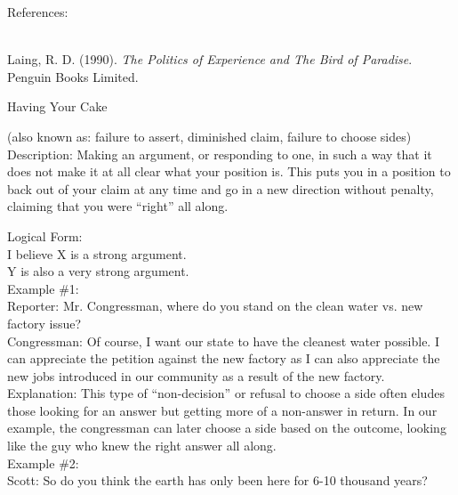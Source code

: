 \documentclass[a4paper,12pt,single,pdftex]{scrartcl}
\begin{document}
    References:

    
      
        
      \\

      
        
          Laing, R. D. (1990). {\it The Politics of Experience and The Bird of Paradise}. Penguin Books Limited.
        
      
    
  

Having Your Cake
    
      (also known as: failure to assert, diminished claim, failure to choose sides)
    \\

  
    Description: Making an argument, or responding to one, in such a way that it does not make it at all clear what your position is.  This puts you in a position to back out of your claim at any time and go in a new direction without penalty, claiming that you were “right” all along. 

    
      Logical Form:
    \\

    
      I believe X is a strong argument.
    \\

    
      Y is also a very strong argument.
    \\

    
      Example \#1:
    \\

    
      Reporter: Mr. Congressman, where do you stand on the clean water vs. new factory issue?
    \\

    
      Congressman: Of course, I want our state to have the cleanest water possible.  I can appreciate the petition against the new factory as I can also appreciate the new jobs introduced in our community as a result of the new factory.
    \\

    
      Explanation: This type of “non-decision” or refusal to choose a side often eludes those looking for an answer but getting more of a non-answer in return.  In our example, the congressman can later choose a side based on the outcome, looking like the guy who knew the right answer all along.
    \\

    
      Example \#2:
    \\

    
      Scott: So do you think the earth has only been here for 6-10 thousand years?
    \\
\end{document}
